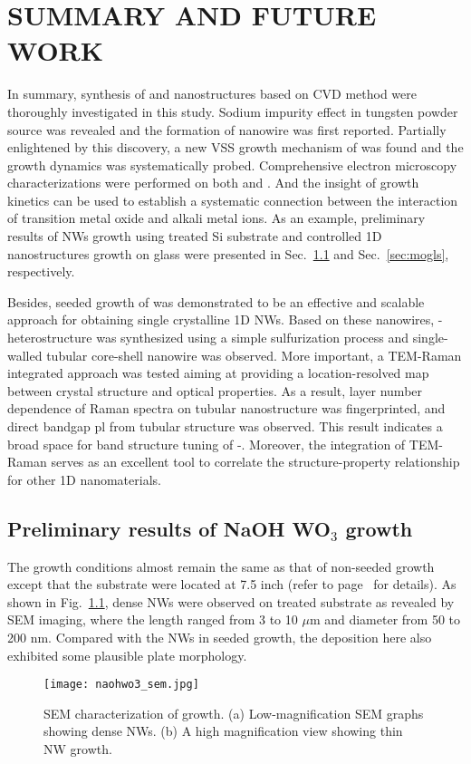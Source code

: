 \chapter{SUMMARY AND FUTURE WORK}

In summary, synthesis of  and  nanostructures based on CVD method were thoroughly investigated in this study. Sodium impurity effect in tungsten powder source was revealed and the formation of  nanowire was first reported. Partially enlightened by this discovery, a new VSS growth mechanism of  was found and the growth dynamics was systematically probed. Comprehensive electron microscopy characterizations were performed on both  and . And the insight of growth kinetics can be used to establish a systematic connection between the interaction of transition metal oxide and alkali metal ions. As an example, preliminary results of  NWs growth using  treated Si substrate and controlled  1D nanostructures growth on glass were presented in Sec.~\ref{sec:nawo} and Sec.~\ref{sec:mogls}, respectively.

Besides, seeded growth of  was demonstrated to be an effective and scalable approach for obtaining single crystalline 1D  NWs. Based on these  nanowires, - heterostructure was synthesized using a simple sulfurization process and single-walled  tubular core-shell nanowire was observed. More important, a TEM-Raman integrated approach was tested aiming at providing a location-resolved map between crystal structure and optical properties. As a result, layer number dependence of Raman spectra on  tubular nanostructure was fingerprinted, and direct bandgap \gls{pl} from  tubular structure was observed. This result indicates a broad space for band structure tuning of -. Moreover, the integration of TEM-Raman serves as an excellent tool to correlate the structure-property relationship for other 1D nanomaterials.

\section{Preliminary results of NaOH WO$_3$ growth}\label{sec:nawo}
The growth conditions almost remain the same as that of non-seeded  growth except that the substrate were located at 7.5 inch (refer to page~\pageref{sec:woxnonseed} for details). As shown in Fig.~\ref{fig:naohwsem}, dense NWs were observed on  treated substrate as revealed by SEM imaging, where the length ranged from 3 to 10 $\mu$m and diameter from 50 to 200 nm. Compared with the  NWs in seeded growth, the deposition here also exhibited some plausible plate morphology.
\begin{figure}[htb]
\centering
\texttt{[image: naohwo3\_sem.jpg]}
\caption[SEM characterization of   growth]{SEM characterization of   growth. (a) Low-magnification SEM graphs showing dense  NWs. (b) A high magnification view showing thin NW growth.}
\label{fig:naohwsem}
\end{figure}

